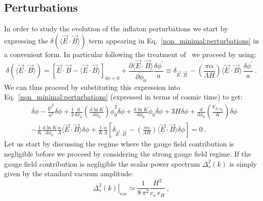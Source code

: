 \subsection{Perturbations}
\label{sec:perturbations}
In order to study the evolution of the inflaton perturbations we start by expressing the $\delta\left( \langle \vec{E}\cdot \vec{B}\rangle\right)$ term appearing in Eq.~\eqref{non_minimal:perturbations} in a convenient form. In particular following the treatment of~\cite{Anber:2009ua} we proceed by using:
\begin{equation}
\label{non_minimal:gauge_field_contrib}
\delta\left( \langle \vec{E}\cdot \vec{B}\rangle\right) = [\vec{E} \cdot \vec{B} - \langle \vec{E} \cdot \vec{B} \rangle]_{\delta \phi = 0} + \frac{\partial \langle \vec{E} \cdot \vec{B} \rangle}{\partial \dot{\phi}_0}\frac{ \delta \phi^{\prime} }{a} \equiv \delta_{\vec{E}\cdot \vec{B}} \, -  \left( \frac{ \pi \alpha}{ \Lambda H } \right)  \langle \vec{E} \cdot \vec{B} \rangle \, \frac{\delta \phi^\prime}{a} \ .
\end{equation}
We can thus proceed by substituting this expression into Eq.~\eqref{non_minimal:perturbations} (expressed in terms of cosmic time) to get:
\begin{equation}
\label{non_minimal:scalar_fluctuations}
\begin{aligned}
	&\ddot{\delta\phi} - \frac{\vec{\nabla}^2}{a^2}\delta\phi +\frac{1}{2} \frac{\textrm{d}}{\textrm{d} \phi_0} \left(\frac{\textrm{d} \ln K}{\textrm{d} \phi_0}\right) \dot{\phi}_0^{ 2} \delta\phi + \frac{\textrm{d} \ln K}{\textrm{d} \phi_0} \dot{\phi}_0 \dot{\delta\phi} + 3H \dot{\delta \phi} + \frac{\textrm{d}}{\textrm{d} \phi_0} \left( \frac{V_{E,\phi_0}}{K}\right)\delta \phi \\ 
	& - \frac{1}{K} \frac{\textrm{d} \ln K}{\textrm{d} \phi_0}  \frac{\alpha}{\Lambda} \langle \vec{E}\cdot \vec{B}\rangle \delta \phi + \frac{1}{K} \frac{\alpha}{\Lambda} \left[ \delta_{\vec{E}\cdot \vec{B}} \, -  \left( \frac{ \pi \alpha}{ \Lambda H } \right)  \langle \vec{E} \cdot \vec{B} \rangle \dot{\delta \phi} \right] = 0 \ .
\end{aligned}
\end{equation}
Let us start by discussing the regime where the gauge field contribution is negligible before we proceed by considering the strong gauge field regime. If the gauge field contribution is negligible the scalar power spectrum $\Delta^2_s(k)$ is simply given by the standard vacuum amplitude:
\begin{equation}
	\left.   \Delta^2_s (k) \right|_\text{vac} \simeq   \frac{ 1 }{8 \, \pi^2 } \frac{H^2}{  c_s \ \epsilon_H }\ , 
\end{equation}
